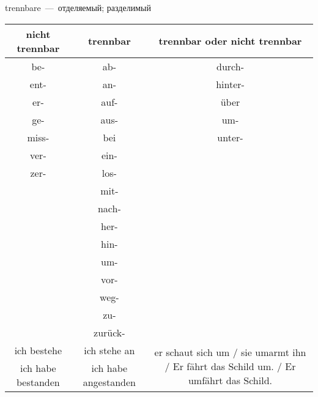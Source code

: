 
trennbare~---~отделяемый; разделимый

\begin{longtable}{|c|c|c|}
\hline
nicht trennbar & trennbar & trennbar oder nicht trennbar \\
\hline
be- & ab- & durch- \\
ent- & an- & hinter- \\
er- & auf- & \"uber \\
ge- & aus- & um- \\
miss- & bei & unter- \\
ver- & ein- & ~ \\
zer- & los- & ~ \\
~ & mit- & ~ \\
~ & nach- & ~ \\
~ & her- & ~ \\
~ & hin- & ~ \\
~ & um- & ~ \\
~ & vor- & ~ \\
~ & weg- & ~ \\
~ & zu- & ~ \\
~ & zur\"uck- & ~ \\
\hline
ich bestehe & ich stehe an & \multirow{2}{7cm}{er schaut sich um / sie umarmt ihn / Er fährt das Schild um. / Er umfährt das Schild.} \\
ich habe bestanden & ich habe angestanden & \\
\hline
\end{longtable}
